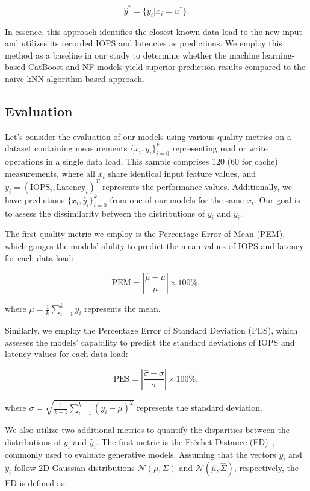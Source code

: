 \begin{equation}
\hat{y}^{*} = \{y_i | x_i = u^{*}\}.
\end{equation}

In essence, this approach identifies the closest known data load to the new input and utilizes its recorded IOPS and latencies as predictions. We employ this method as a baseline in our study to determine whether the machine learning-based CatBoost and NF models yield superior prediction results compared to the naive kNN algorithm-based approach.


\subsection{Evaluation}
Let's consider the evaluation of our models using various quality metrics on a dataset containing measurements $\{x_i, y_i\}_{i=0}^{k}$ representing read or write operations in a single data load. This sample comprises 120 (60 for cache) measurements, where all $x_i$ share identical input feature values, and $y_i = (\text{IOPS}_i, \text{Latency}_i)^T$ represents the performance values. Additionally, we have predictions $\{x_i, \hat{y}_i\}_{i=0}^{k}$ from one of our models for the same $x_i$. Our goal is to assess the dissimilarity between the distributions of $y_i$ and $\hat{y}_i$.

The first quality metric we employ is the Percentage Error of Mean (PEM), which gauges the models' ability to predict the mean values of IOPS and latency for each data load:

\begin{equation}
\text{PEM} = \left|{\frac{\hat{\mu} - \mu}{\mu}}\right|\times 100\%,
\end{equation}

where $\mu = \frac{1}{k}\sum_{i=1}^{k} y_i$ represents the mean.

Similarly, we employ the Percentage Error of Standard Deviation (PES), which assesses the models' capability to predict the standard deviations of IOPS and latency values for each data load:

\begin{equation}
\text{PES} = \left|{\frac{\hat{\sigma} - \sigma}{\sigma}}\right|\times 100\%,
\end{equation}

where $\sigma = \sqrt{\frac{1}{k-1}\sum_{i=1}^{k} (y_i-\mu)^2}$ represents the standard deviation.

We also utilize two additional metrics to quantify the disparities between the distributions of $y_i$ and $\hat{y}_i$. The first metric is the Fréchet Distance (FD)~\cite{DOWSON1982450}, commonly used to evaluate generative models. Assuming that the vectors $y_i$ and $\hat{y}_i$ follow 2D Gaussian distributions $\mathcal{N}(\mu, \Sigma)$ and $\mathcal{N}(\hat{\mu}, \hat{\Sigma})$, respectively, the FD is defined as:


